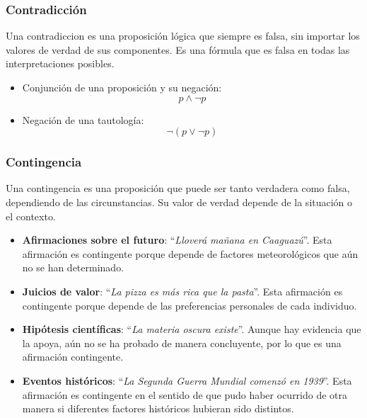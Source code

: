 \subsubsection{Contradicción}
Una \gls{contradiccion} es una proposición lógica que siempre es falsa, sin importar los valores de verdad de sus componentes. Es una fórmula que es falsa en todas las interpretaciones posibles.

\begin{fmd-example}[Contradicción]
	\begin{itemize}
		\item Conjunción de una proposición y su negación:
		\[ p \land \neg p \]
		
		\item Negación de una tautología:
		\[ \neg \left( p \lor \neg p \right) \]
	\end{itemize}
\end{fmd-example}

\subsubsection{Contingencia} 
Una \gls{contingencia} es una proposición que puede ser tanto verdadera como falsa, dependiendo de las circunstancias. Su valor de verdad depende de la situación o el contexto.

\begin{fmd-example}[Contingencia]
	\begin{itemize}
		\item \textbf{Afirmaciones sobre el futuro}: ``\textit{Lloverá mañana en Caaguazú}''. Esta afirmación es contingente porque depende de factores meteorológicos que aún no se han determinado.
		\item \textbf{Juicios de valor}: ``\textit{La pizza es más rica que la pasta}''. Esta afirmación es contingente porque depende de las preferencias personales de cada individuo.
		\item \textbf{Hipótesis científicas}: ``\textit{La materia oscura existe}''. Aunque hay evidencia que la apoya, aún no se ha probado de manera concluyente, por lo que es una afirmación contingente.
		\item \textbf{Eventos históricos}: ``\textit{La Segunda Guerra Mundial comenzó en 1939}''. Esta afirmación es contingente en el sentido de que pudo haber ocurrido de otra manera si diferentes factores históricos hubieran sido distintos.
	\end{itemize}
\end{fmd-example}

